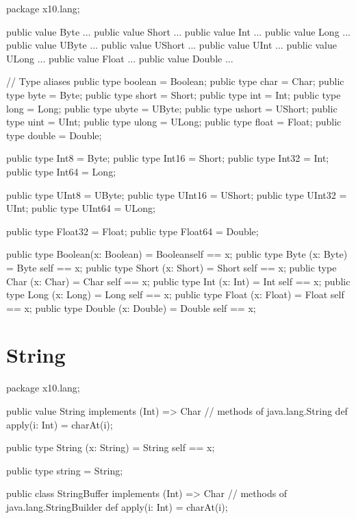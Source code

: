\begin{xten}
package x10.lang;

public value Byte   { ... }
public value Short  { ... }
public value Int    { ... }
public value Long   { ... }
public value UByte  { ... }
public value UShort { ... }
public value UInt   { ... }
public value ULong  { ... }
public value Float  { ... }
public value Double { ... }

// Type aliases
public type boolean = Boolean;
public type char = Char;
public type byte = Byte;
public type short = Short;
public type int = Int;
public type long = Long;
public type ubyte = UByte;
public type ushort = UShort;
public type uint = UInt;
public type ulong = ULong;
public type float = Float;
public type double = Double;

public type Int8    = Byte;
public type Int16   = Short;
public type Int32   = Int;
public type Int64   = Long;

public type UInt8   = UByte;
public type UInt16  = UShort;
public type UInt32  = UInt;
public type UInt64  = ULong;

public type Float32 = Float;
public type Float64 = Double;

public type Boolean(x: Boolean) = Boolean{self == x};
public type Byte   (x: Byte)    = Byte   {self == x};
public type Short  (x: Short)   = Short  {self == x};
public type Char   (x: Char)    = Char   {self == x};
public type Int    (x: Int)     = Int    {self == x};
public type Long   (x: Long)    = Long   {self == x};
public type Float  (x: Float)   = Float  {self == x};
public type Double (x: Double)  = Double {self == x};
\end{xten}

\section{String}

\begin{xten}
package x10.lang;

public value String implements (Int) => Char {
    // methods of java.lang.String
    def apply(i: Int) = charAt(i);
}

public type String (x: String) = String {self == x};

public type string = String;

public class StringBuffer implements (Int) => Char {
    // methods of java.lang.StringBuilder
    def apply(i: Int) = charAt(i);
}
\end{xten}

